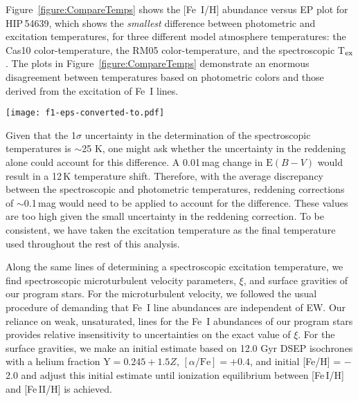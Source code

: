 \documentclass[revtex4]{emulateapj}
\begin{document}
Figure~\ref{figure:CompareTemps} shows the [Fe~I/H] abundance versus EP plot for HIP\,54639, which shows the \emph{smallest} difference between photometric and excitation temperatures, for three different model atmosphere temperatures: the Cas10 color-temperature, the RM05 color-temperature, and the spectroscopic T$_{\rm ex}$.  The plots in Figure~\ref{figure:CompareTemps} demonstrate an enormous disagreement between temperatures based on photometric colors and those derived from the excitation of Fe~I lines.

\begin{figure*}[t]
\centering
\texttt{[image: f1-eps-converted-to.pdf]}
\caption{Abundance trends with EP for HIP\,54639 based on choice of color-temperature relation.  \emph{Left}: T$_{\mathrm{eff}}$ derived with Cas10 color-temperature relation.  \emph{Center}: T$_{\mathrm{eff}}$ determined with RM05 color-temperature relation.  \emph{Right}: T$_{\mathrm{ex}}$ derived by removing trend in abundance with EP.  The large disagreement between photometric and excitation temperatures is clearly evident from the slopes of the left and center plots.  The abundances derived using these photometric temperatures would depend heavily on line EP, whereas the excitation temperature provides abundances independent of line EP. \label{figure:CompareTemps}}
\vspace{0.25cm}
\end{figure*}

Given that the 1$\sigma$ uncertainty in the determination of the spectroscopic temperatures is $\sim$25 K, one might ask whether the uncertainty in the reddening alone could account for this difference.  A 0.01\,mag change in $\mathrm{E}(B-V)$ would result in a 12\,K temperature shift.  Therefore, with the average discrepancy between the spectroscopic and photometric temperatures, reddening corrections of $\sim$0.1\,mag would need to be applied to account for the difference.  These values are too high given the small uncertainty in the reddening correction.  To be consistent, we have taken the excitation temperature as the final temperature used throughout the rest of this analysis.

Along the same lines of determining a spectroscopic excitation temperature, we find spectroscopic microturbulent velocity parameters, $\xi$, and surface gravities of our program stars.  For the microturbulent velocity, we followed the usual procedure \citep[e.g.][]{SE1934,Garz1969} of demanding that Fe~I line abundances are independent of EW.  Our reliance on weak, unsaturated, lines for the Fe~I abundances of our program stars provides relative insensitivity to uncertainties on the exact value of $\xi$.  For the surface gravities, we make an initial estimate based on 12.0 Gyr DSEP isochrones with a helium fraction Y$ = 0.245+1.5Z$, $[\alpha/\mathrm{Fe}] = +0.4$, and initial [Fe/H] = $-$2.0 and adjust this initial estimate until ionization equilibrium between [Fe\,I/H] and [Fe\,II/H] is achieved. 
\end{document}
